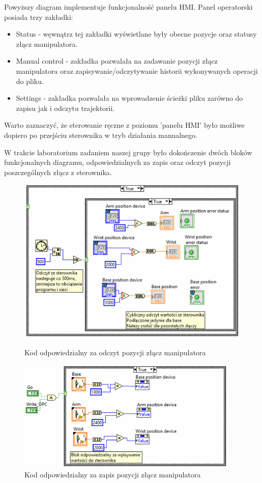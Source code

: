 \documentclass[margin = 2cm]{article}
\begin{document}
Powyższy diagram implementuje funkcjonalność panelu HMI. Panel operatorski posiada trzy zakładki:

\begin{itemize}
\item Status - węwnątrz tej zakładki wyświetlane były obecne pozycje oraz statusy złącz manipulatora.
\item Manual control - zakładka pozwalała na zadawanie pozycji złącz manipulatora oraz zapisywanie/odczytywanie historii wykonywanych operacji do pliku. 
\item Settings - zakładka pozwalała na wprowadzenie ścieżki pliku zarówno do zapisu jak i odczytu trajektorii.
\end{itemize}

Warto zaznaczyć, że sterowanie ręczne z poziomu 'panelu HMI' było możliwe dopiero po przejściu sterownika w tryb działania manualnego.

W trakcie laboratorium zadaniem naszej grupy było dokończenie dwóch bloków funkcjonalnych diagramu, odpowiedzialnych za zapis oraz odczyt pozycji poszczególnych złącz z sterownika.

\begin{figure}[H]
	\begin{minipage}[t]{0.4\textwidth}
	\centering
	\includegraphics[width=\textwidth]{odczyt}
	\caption{Kod odpowiedzialny za odczyt pozycji złącz manipulatora}
	\end{minipage}
	\hfill
	\begin{minipage}[t]{0.49\textwidth}
	\centering
	\includegraphics[width=0.94\textwidth]{zapis}
	\caption{Kod odpowiedzialny za zapis pozycji złącz manipulatora}
	\end{minipage}
\end{figure}
\end{document}
